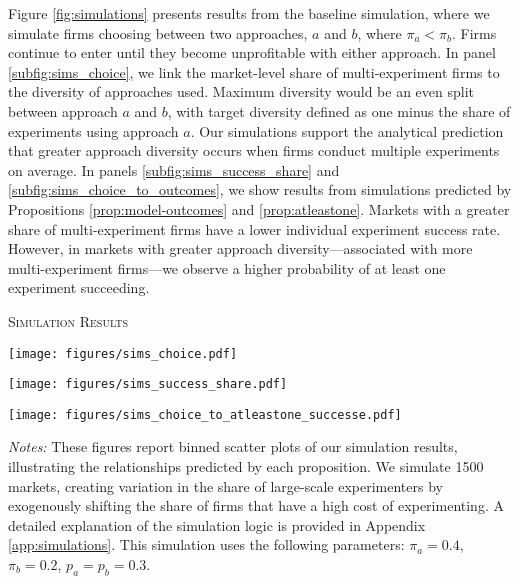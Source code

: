 Figure \ref{fig:simulations} presents results from the baseline simulation, where we simulate firms choosing between two approaches, $a$ and $b$, where $\pi_a < \pi_b$. Firms continue to enter until they become unprofitable with either approach. In panel \ref{subfig:sims_choice}, we link the market-level share of multi-experiment firms to the diversity of approaches used. Maximum diversity would be an even split between approach $a$ and $b$, with target diversity defined as one minus the share of experiments using approach $a$. Our simulations support the analytical prediction that greater approach diversity occurs when firms conduct multiple experiments on average. In panels \ref{subfig:sims_success_share} and \ref{subfig:sims_choice_to_outcomes}, we show results from simulations predicted by Propositions \ref{prop:model-outcomes} and \ref{prop:atleastone}. Markets with a greater share of multi-experiment firms have a lower individual experiment success rate. However, in markets with greater approach diversity---associated with more multi-experiment firms---we observe a higher probability of at least one experiment succeeding.

\begin{lightfigure}[h!]
\caption{\textsc{Simulation Results}}
\label{fig:simulations}
    \centering
    \begin{sublightfigure}[t]{.3\textwidth}
        \centering
        \caption{}
        \texttt{[image: figures/sims\_choice.pdf]}
        \label{subfig:sims_choice}
    \end{sublightfigure}
    \begin{sublightfigure}[t]{.3\textwidth}
        \centering
        \caption{}
        \texttt{[image: figures/sims\_success\_share.pdf]}
        \label{subfig:sims_success_share}
    \end{sublightfigure}
    \begin{sublightfigure}[t]{.3\textwidth}
        \centering
        \caption{}
        \texttt{[image: figures/sims\_choice\_to\_atleastone\_successe.pdf]}
        \label{subfig:sims_choice_to_outcomes}
    \end{sublightfigure}
\caption*{\scriptsize\emph{Notes:} These figures report binned scatter plots of our simulation results, illustrating the relationships predicted by each proposition. We simulate 1500 markets, creating variation in the share of large-scale experimenters by exogenously shifting the share of firms that have a high cost of experimenting. A detailed explanation of the simulation logic is provided in Appendix \ref{app:simulations}. This simulation uses the following parameters: $\pi_a = 0.4$, $\pi_b = 0.2$, $p_a = p_b = 0.3$.}
\end{lightfigure}

